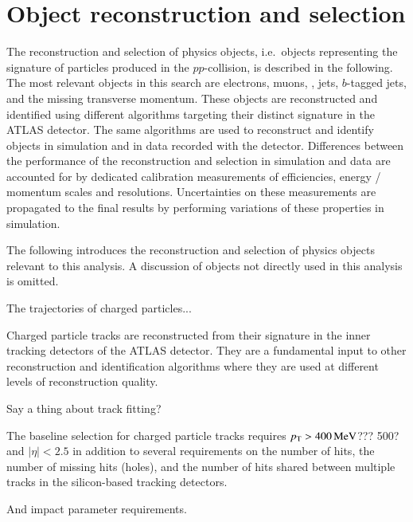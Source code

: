 \section{Object reconstruction and selection}
\label{sec:object_reconstruction}

The reconstruction and selection of physics objects, i.e.\ objects
representing the signature of particles produced in the
$pp$-collision, is described in the following. The most relevant
objects in this search are electrons, muons, \tauhadvis, jets,
$b$-tagged jets, and the missing transverse momentum. These objects
are reconstructed and identified using different algorithms targeting
their distinct signature in the ATLAS detector. The same algorithms
are used to reconstruct and identify objects in simulation and in data
recorded with the detector.  Differences between the performance of
the reconstruction and selection in simulation and data are accounted
for by dedicated calibration measurements of efficiencies, energy /
momentum scales and resolutions. Uncertainties on these measurements
are propagated to the final results by performing variations of these
properties in simulation.

The following introduces the reconstruction and selection of physics
objects relevant to this analysis. A discussion of objects not
directly used in this analysis is omitted.



The trajectories of charged particles...

Charged particle tracks are reconstructed from their signature in the
inner tracking detectors of the ATLAS detector. They are a fundamental
input to other reconstruction and identification algorithms where they
are used at different levels of reconstruction quality.

Say a thing about track fitting?

The baseline selection for charged particle tracks requires
$\pT > \SI{400}{\MeV}$??? 500?  and $|\eta| < \num{2.5}$ in addition
to several requirements on the number of hits, the number of missing
hits (holes), and the number of hits shared between multiple tracks in
the silicon-based tracking detectors.

And impact parameter requirements.

\cite{PERF-2015-08}

